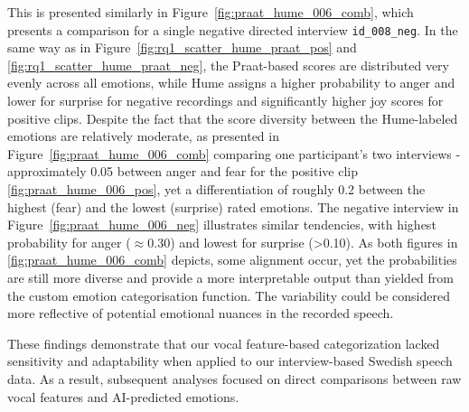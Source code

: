     
This is presented similarly in Figure~\ref{fig:praat_hume_006_comb}, which presents a comparison for a single negative 
directed interview \texttt{id\_008\_neg}. In the same way as in Figure~\ref{fig:rq1_scatter_hume_praat_pos} and \ref{fig:rq1_scatter_hume_praat_neg}, 
the Praat-based scores are distributed very evenly across all emotions, while Hume assigns a higher probability to anger and lower for surprise for negative recordings and significantly higher joy scores for positive clips.
Despite the fact that the score diversity between the Hume-labeled emotions are relatively 
moderate, as presented in Figure~\ref{fig:praat_hume_006_comb} comparing one participant's two interviews - approximately 0.05 between anger and fear for the positive clip \ref{fig:praat_hume_006_pos}, yet a differentiation of roughly 0.2 between the highest (fear) and the lowest (surprise) rated emotions. 
The negative interview in Figure~\ref{fig:praat_hume_006_neg} illustrates similar tendencies, with highest probability for anger ($\approx 0.30$) and lowest for surprise (>0.10). 
As both figures in \ref{fig:praat_hume_006_comb} depicts, some alignment occur, yet the probabilities are still more diverse and provide a more interpretable output than yielded from the custom emotion categorisation function. 
The variability could be considered more reflective of potential emotional nuances in the recorded speech. 

These findings demonstrate that our vocal feature-based categorization lacked sensitivity and adaptability when applied to our interview-based Swedish speech data. 
As a result, subsequent analyses focused on direct comparisons between raw vocal features and AI-predicted emotions. 


